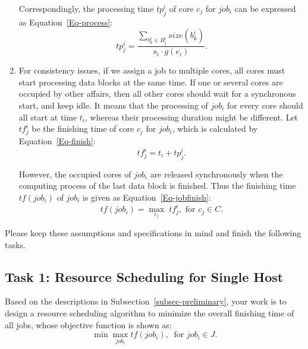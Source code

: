 \documentclass{llncs}
\begin{document}
\begin{enumerate}
  \qquad Correspondingly, the processing time $tp^i_{j}$ of core $c_j$ for $job_i$ can be expressed as Equation~\eqref{Eq-process}:
  \begin{equation} \label{Eq-process}
  tp^i_{j} = \frac{\sum_{b^i_{k} \in B^i_{j}}size(b^i_{k})}{s_i \cdot g(e_i)}.
  \end{equation}

  \vspace{2mm}

  \item For consistency issues, if we assign a job to multiple cores, all cores must start processing data blocks at the same time. If one or several cores are occupied by other affairs, then all other cores should wait for a synchronous start, and keep idle. It means that the processing of $job_i$ for every core should all start at time $t_i$, whereas their processing duration might be different. Let $tf^i_{j}$ be the finishing time of core $c_j$ for $job_i$, which is calculated by Equation~\eqref{Eq-finish}:
  \begin{equation} \label{Eq-finish}
  tf^i_{j} = t_i + tp^i_{j}.
  \end{equation}

  However, the occupied cores of $job_i$ are released synchronously when the computing process of the last data block is finished. Thus the finishing time $tf(job_i)$ of $job_i$ is given as Equation~\eqref{Eq-jobfinish}:
  \begin{equation} \label{Eq-jobfinish}
  tf(job_i) = \max_{c_j} \; tf^i_{j}, \text{ for } c_j \in C.
  \end{equation}
\end{enumerate}


Please keep these assumptions and specifications in mind and finish the following tasks.


\subsection{Task 1: Resource Scheduling for Single Host} \label{subsec-single}

Based on the descriptions in Subsection~\ref{subsec-preliminary}, your work is to design a resource scheduling algorithm to minimize the overall finishing time of all jobs, whose objective function is shown as:
  \begin{equation*}
  \min \max_{job_i} tf(job_i), \ \text{ for } job_i \in J.
  \end{equation*}
\end{document}
